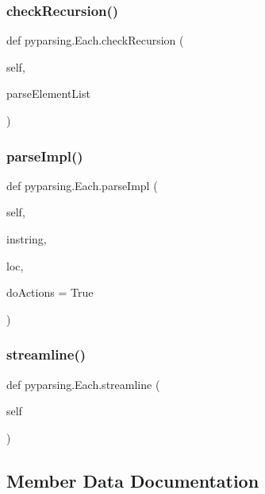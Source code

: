 \subsubsection{\texorpdfstring{check\+Recursion()}{checkRecursion()}}
{\footnotesize\ttfamily def pyparsing.\+Each.\+check\+Recursion (\begin{DoxyParamCaption}\item[{}]{self,  }\item[{}]{parse\+Element\+List }\end{DoxyParamCaption})}

\mbox{\label{classpyparsing_1_1Each_a91e9bec1fb49f2960fbb301dd9eabd08}} 
\subsubsection{\texorpdfstring{parse\+Impl()}{parseImpl()}}
{\footnotesize\ttfamily def pyparsing.\+Each.\+parse\+Impl (\begin{DoxyParamCaption}\item[{}]{self,  }\item[{}]{instring,  }\item[{}]{loc,  }\item[{}]{do\+Actions = {\ttfamily True} }\end{DoxyParamCaption})}

\mbox{\label{classpyparsing_1_1Each_af6c1a0a6a144fd2f12bc7b7b668685e1}} 
\subsubsection{\texorpdfstring{streamline()}{streamline()}}
{\footnotesize\ttfamily def pyparsing.\+Each.\+streamline (\begin{DoxyParamCaption}\item[{}]{self }\end{DoxyParamCaption})}



\subsection{Member Data Documentation}
\mbox{\label{classpyparsing_1_1Each_af472985b6c1072ff3f3b438a31e61011}} 
